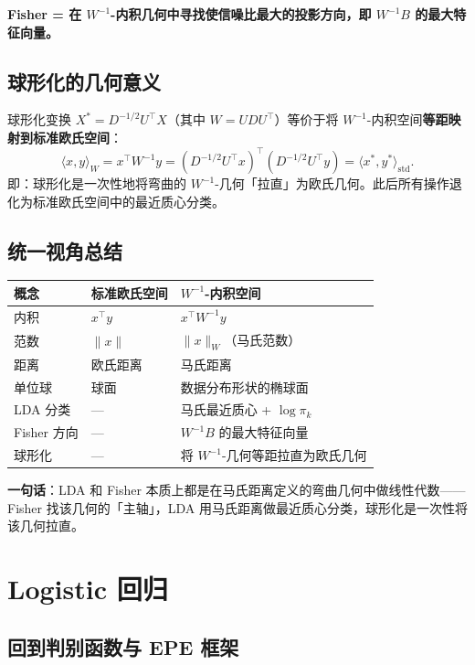 \textbf{Fisher = 在 $W^{-1}$-内积几何中寻找使信噪比最大的投影方向，即 $W^{-1}B$ 的最大特征向量。}

\subsection{球形化的几何意义}

球形化变换 $X^* = D^{-1/2}U^\top X$（其中 $W = UDU^\top$）等价于将 $W^{-1}$-内积空间\textbf{等距映射到标准欧氏空间}：
\[
\langle x, y \rangle_W = x^\top W^{-1} y = (D^{-1/2}U^\top x)^\top (D^{-1/2}U^\top y) = \langle x^*, y^* \rangle_{\text{std}}.
\]
即：球形化是一次性地将弯曲的 $W^{-1}$-几何「拉直」为欧氏几何。此后所有操作退化为标准欧氏空间中的最近质心分类。

\subsection{统一视角总结}

\begin{center}
\begin{tabular}{lll}
\toprule
概念 & 标准欧氏空间 & $W^{-1}$-内积空间 \\
\midrule
内积 & $x^\top y$ & $x^\top W^{-1} y$ \\
范数 & $\|x\|$ & $\|x\|_W$（马氏范数） \\
距离 & 欧氏距离 & 马氏距离 \\
单位球 & 球面 & 数据分布形状的椭球面 \\
LDA 分类 & — & 马氏最近质心 + $\log\pi_k$ \\
Fisher 方向 & — & $W^{-1}B$ 的最大特征向量 \\
球形化 & — & 将 $W^{-1}$-几何等距拉直为欧氏几何 \\
\bottomrule
\end{tabular}
\end{center}

\textbf{一句话}：LDA 和 Fisher 本质上都是在马氏距离定义的弯曲几何中做线性代数——Fisher 找该几何的「主轴」，LDA 用马氏距离做最近质心分类，球形化是一次性将该几何拉直。


\section{Logistic 回归}

\subsection{回到判别函数与 EPE 框架}

